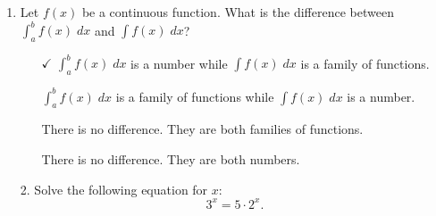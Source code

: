 \documentclass[11pt]{article}
\begin{document}
\pagestyle{empty}
\newsavebox{\quizfront}
\begin{lrbox}{\quizfront}
\begin{minipage}[top][4.5in][t]{\textwidth} \setlength{\parindent}{1.5em}
\drawtitle
\vspace{-0.5in}
\begin{enumerate}

\item Let $f(x)$ be a continuous function. What is the difference
  between $\int_a^b f(x) \; dx$ and $\int f(x)\; dx$?

  \vfill

  \begin{itemize}
  \item[\textcircled{{\color{blue}$\checkmark$}}] $\int_a^b f(x)\;dx$
    is a number while $\int f(x)\; dx$ is a family of functions.
    \vfill
  \item[\textbigcircle] $\int_a^b f(x)\;dx$ is a family of functions
    while $\int f(x)\; dx$ is a number.
    \vfill
  \item[\textbigcircle] There is no difference.  They are both
    families of functions.
    \vfill
  \item[\textbigcircle] There is no difference.  They are both
    numbers.
    \vfill
  \end{itemize}



\end{enumerate}



\end{minipage}
\end{lrbox}

\newsavebox{\quizback}
\begin{lrbox}{\quizback}
\begin{minipage}[top][4.5in][t]{\textwidth} \setlength{\parindent}{1.5em}
\begin{itemize}
\item[2.] Solve the following equation for $x$:
  \[
  3^x = 5\cdot 2^x.
  \]


\end{itemize}
\end{minipage}
\end{lrbox}

\noindent \usebox{\quizfront}
\vfill

\end{document}
